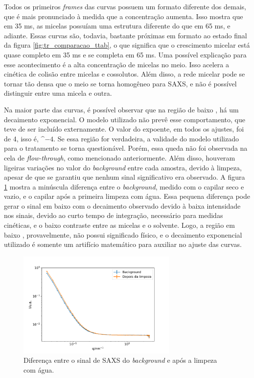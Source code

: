 	
	Todos os primeiros \emph{frames} das curvas possuem um formato diferente dos demais, que é mais pronunciado à medida que a concentração aumenta. Isso mostra que em 35 ms, as micelas possuíam uma estrutura diferente do que em 65 ms, e adiante. Essas curvas são, todavia, bastante próximas em formato ao estado final da figura \ref{fig:tr_comparacao_ttab}, o que significa que o crescimento micelar está quase completo em 35 ms e se completa em 65 ms. Uma possível explicação para esse acontecimento é a alta concentração de micelas no meio. Isso acelera a cinética de colisão entre micelas e cossolutos. Além disso, a rede micelar pode se tornar tão densa que o meio se torna homogêneo para SAXS, e não é possível distinguir entre uma micela e outra.
	
	Na maior parte das curvas, é possível observar que na região de baixo \q, há um decaimento exponencial. O modelo utilizado não prevê esse comportamento, que teve de ser incluído externamente. O valor do expoente, em todos os ajustes, foi de 4, isso é, \( \^{-4} \). Se essa região for verdadeira, a validade do modelo utilizado para o tratamento se torna questionável. Porém, essa queda não foi observada na cela de \emph{flow-through}, como mencionado anteriormente. Além disso, houveram ligeiras variações no valor do \emph{background} entre cada amostra, devido à limpeza, apesar de que se garantiu que nenhum sinal significativo era observado. A figura \ref{fig:problema_limpeza} mostra a minúscula diferença entre o \emph{background}, medido com o capilar seco e vazio, e o capilar após a primeira limpeza com água. Essa pequena diferença pode gerar o sinal em baixo \q{} com o decaimento observado devido à baixa intensidade nos sinais, devido ao curto tempo de integração, necessário para medidas cinéticas, e o baixo contraste entre as micelas e o solvente. Logo, a região em baixo \q{}, provavelmente, não possui significado físico, e o decaimento exponencial utilizado é somente um artifício matemático para auxiliar no ajuste das curvas.
	
	\begin{figure}[h]
		\centering
		\includegraphics[width=0.7\textwidth]{imagens/saxs/problema_limpeza}
		\caption{Diferença entre o sinal de SAXS do \emph{background} e após a limpeza com água.}
		\label{fig:problema_limpeza}
	\end{figure}

